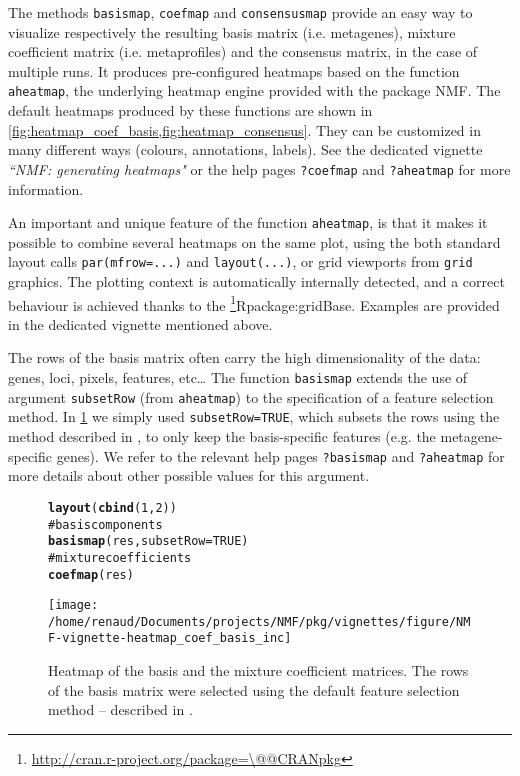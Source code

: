 \documentclass[a4paper]{article}\usepackage{graphicx, color}
\makeatletter
\def\maxwidth{ %
  \ifdim\Gin@nat@width>\linewidth
    \linewidth
  \else
    \Gin@nat@width
  \fi
}
\newcommand{\hlfunctioncall}[1]{\textcolor[rgb]{0.501960784313725,0,0.329411764705882}{\textbf{#1}}}%
\newcommand{\hlcomment}[1]{\textcolor[rgb]{0.180392156862745,0.6,0.341176470588235}{#1}}%
\newenvironment{kframe}{%
 \def\at@end@of@kframe{}%
 \ifinner\ifhmode%
  \def\at@end@of@kframe{\end{minipage}}%
  \begin{minipage}{\columnwidth}%
 \fi\fi%
 \def\FrameCommand##1{\hskip\@totalleftmargin \hskip-\fboxsep
 \colorbox{shadecolor}{##1}\hskip-\fboxsep
     \hskip-\linewidth \hskip-\@totalleftmargin \hskip\columnwidth}%
 \MakeFramed {\advance\hsize-\width
   \@totalleftmargin\z@ \linewidth\hsize
   \@setminipage}}%
 {\par\unskip\endMakeFramed%
 \at@end@of@kframe}
\newenvironment{knitrout}{}{} %
\let\code=\texttt
\newcommand{\pkgname}[1]{\textit{#1}\xspace}
\newcommand{\CRANurl}[1]{\url{http://cran.r-project.org/package=#1}}
\def\CRANpkg{\@ifstar\@CRANpkg\@@CRANpkg}
\def\@CRANpkg#1{\href{http://cran.r-project.org/package=#1}{\pkgname{#1}}\footnote{\CRANurl{#1}}}
\def\@@CRANpkg#1{\href{http://cran.r-project.org/package=#1}{\pkgname{#1}} package\footnote{\CRANurl{#1}}}
\def\citeCRANpkg{\@ifstar\@citeCRANpkg\@@citeCRANpkg}
\def\@citeCRANpkg#1{\CRANpkg{#1}\cite*{Rpackage:#1}}
\def\@@citeCRANpkg#1{\CRANpkg{#1}~\cite{Rpackage:#1}}
\renewcommand{\cite}[1]{\parencite{#1}}
\makeatother
\begin{document}
The methods \code{basismap}, \code{coefmap} and \code{consensusmap} provide an
easy way to visualize respectively the resulting basis matrix (i.e. metagenes),
mixture coefficient matrix (i.e. metaprofiles) and the consensus matrix, in the
case of multiple runs.
It produces pre-configured heatmaps based on the function \code{aheatmap}, the
underlying heatmap engine provided with the package NMF. 
The default heatmaps produced by these functions are shown in
\cref{fig:heatmap_coef_basis,fig:heatmap_consensus}.
They can be customized in many different ways (colours, annotations, labels).
See the dedicated vignette \emph{``NMF: generating heatmaps"} or the help pages
\code{?coefmap} and \code{?aheatmap} for more information.

An important and unique feature of the function \code{aheatmap}, is that it
makes it possible to combine several heatmaps on the same plot, using the both
standard layout calls \texttt{par(mfrow=...)} and \texttt{layout(...)}, or grid
viewports from \texttt{grid} graphics.
The plotting context is automatically internally detected, and a correct
behaviour is achieved thanks to the \citeCRANpkg{gridBase}.
Examples are provided in the dedicated vignette mentioned above.

The rows of the basis matrix often carry the high dimensionality of the data: genes, loci, pixels, features, etc\ldots 
The function \code{basismap} extends the use of argument \code{subsetRow} (from \code{aheatmap}) to the specification of a feature selection method.
In \cref{fig:heatmap_coef_basis} we simply used \code{subsetRow=TRUE}, which subsets the rows using the method described in \cite{KimH2007}, to only keep the basis-specific features (e.g. the metagene-specific genes). 
We refer to the relevant help pages \code{?basismap} and \code{?aheatmap} for more details about other possible values for this argument.

\begin{figure}[!htbp]
\centering
\begin{knitrout}
\color{fgcolor}\begin{kframe}
\begin{alltt}
\hlfunctioncall{layout}(\hlfunctioncall{cbind}(1, 2))
\hlcomment{# basis components}
\hlfunctioncall{basismap}(res, subsetRow = TRUE)
\hlcomment{# mixture coefficients}
\hlfunctioncall{coefmap}(res)
\end{alltt}
\end{kframe}
\texttt{[image: /home/renaud/Documents/projects/NMF/pkg/vignettes/figure/NMF-vignette-heatmap\_coef\_basis\_inc]} 

\end{knitrout}

\caption{Heatmap of the basis and the mixture coefficient matrices. The rows of the basis matrix were selected using the default feature selection method -- described in \cite{KimH2007}.}
\label{fig:heatmap_coef_basis}
\end{figure}
\end{document}
